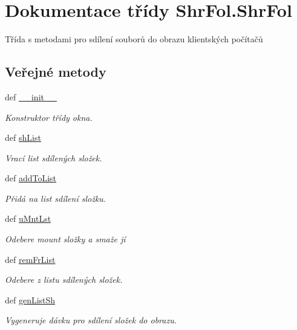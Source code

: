 \hypertarget{classShrFol_1_1ShrFol}{\section{Dokumentace třídy Shr\-Fol.\-Shr\-Fol}
\label{d1/dce/classShrFol_1_1ShrFol}
}


Třída s metodami pro sdílení souborů do obrazu klientských počítačů  


\subsection*{Veřejné metody}
\begin{DoxyCompactItemize}
\item 
def \hyperlink{classShrFol_1_1ShrFol_aab76b87908cebac7e15bed64b47ebf73}{\-\_\-\-\_\-init\-\_\-\-\_\-}
\begin{DoxyCompactList}\small\item\em Konstruktor třídy okna. \end{DoxyCompactList}\item 
def \hyperlink{classShrFol_1_1ShrFol_a9c6d9419ead704adaa83dd00209f7d8d}{sh\-List}
\begin{DoxyCompactList}\small\item\em Vrací list sdílených složek. \end{DoxyCompactList}\item 
def \hyperlink{classShrFol_1_1ShrFol_a9f817cf66c0e30b0f6f7fe8dc56ca7da}{add\-To\-List}
\begin{DoxyCompactList}\small\item\em Přidá na list sdílení složku. \end{DoxyCompactList}\item 
def \hyperlink{classShrFol_1_1ShrFol_a09764ae9bb636491c06f49b382d96632}{u\-Mnt\-Lst}
\begin{DoxyCompactList}\small\item\em Odebere mount složky a smaže jí \end{DoxyCompactList}\item 
def \hyperlink{classShrFol_1_1ShrFol_a73b990abe1e0a91da9f90fda31c686b7}{rem\-Fr\-List}
\begin{DoxyCompactList}\small\item\em Odebere z listu sdílených složek. \end{DoxyCompactList}\item 
def \hyperlink{classShrFol_1_1ShrFol_a689d7f68c00bb7fb068646bdbbec97b8}{gen\-List\-Sh}
\begin{DoxyCompactList}\small\item\em Vygeneruje dávku pro sdílení složek do obrazu. \end{DoxyCompactList}\item 

\end{DoxyCompactItemize}
